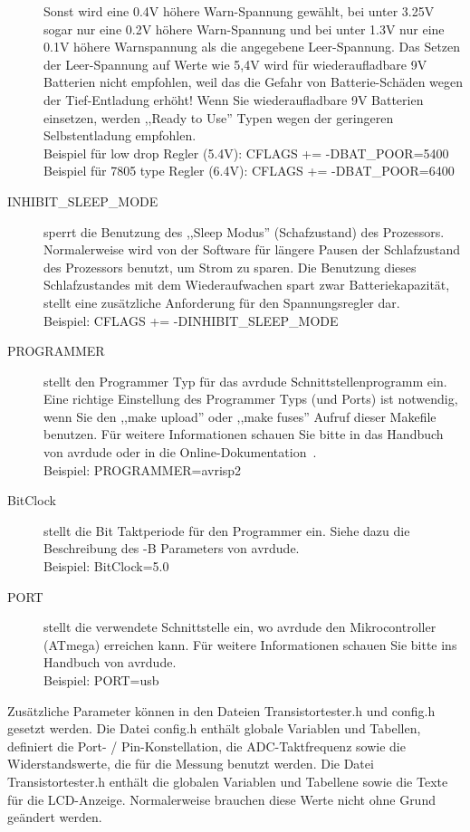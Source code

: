 \begin{description}
Sonst wird eine 0.4V höhere Warn-Spannung gewählt, bei unter 3.25V sogar nur eine 0.2V höhere Warn-Spannung und
bei unter 1.3V nur eine 0.1V höhere Warnspannung als die angegebene Leer-Spannung.
Das Setzen der Leer-Spannung auf Werte wie 5,4V wird für wiederaufladbare 9V Batterien nicht empfohlen,
weil das die Gefahr von Batterie-Schäden wegen der Tief-Entladung erhöht!
Wenn Sie wiederaufladbare 9V Batterien einsetzen, werden ,,Ready to Use'' Typen wegen der geringeren Selbstentladung empfohlen.\\
Beispiel für low drop Regler (5.4V): CFLAGS += -DBAT\_POOR=5400 \\
Beispiel für 7805 type Regler (6.4V): CFLAGS += -DBAT\_POOR=6400
  \item[INHIBIT\_SLEEP\_MODE] sperrt die Benutzung des ,,Sleep Modus'' (Schafzustand) des Prozessors.
Normalerweise wird von der Software für längere Pausen der Schlafzustand des Prozessors benutzt, um Strom zu sparen.
Die Benutzung dieses Schlafzustandes mit dem Wiederaufwachen spart zwar Batteriekapazität, 
stellt eine zusätzliche Anforderung für den Spannungsregler dar.\\
Beispiel: CFLAGS += -DINHIBIT\_SLEEP\_MODE
  \item[PROGRAMMER] stellt den Programmer Typ für das avrdude Schnittstellenprogramm ein.
Eine richtige Einstellung des Programmer Typs (und Ports) ist notwendig, wenn Sie den ,,make upload'' oder
,,make fuses'' Aufruf dieser Makefile benutzen.
Für weitere Informationen schauen Sie bitte in das Handbuch von avrdude oder in die Online-Dokumentation~\cite{avrdude}.\\
Beispiel: PROGRAMMER=avrisp2
  \item[BitClock] stellt die Bit Taktperiode für den Programmer ein. Siehe dazu die Beschreibung des -B Parameters von avrdude.\\
Beispiel: BitClock=5.0
  \item[PORT] stellt die verwendete Schnittstelle ein, wo avrdude den Mikrocontroller (ATmega) erreichen kann.
Für weitere Informationen schauen Sie bitte ins Handbuch von avrdude.\\
Beispiel: PORT=usb

\end{description}

Zusätzliche Parameter können in den Dateien Transistortester.h und config.h gesetzt werden.
Die Datei config.h enthält globale Variablen und Tabellen, definiert die Port- / Pin-Konstellation,
die ADC-Taktfrequenz sowie die Widerstandswerte, die für die Messung benutzt werden.
Die Datei Transistortester.h enthält die globalen Variablen und Tabellene sowie die Texte für die LCD-Anzeige.
Normalerweise brauchen diese Werte nicht ohne Grund geändert werden.
